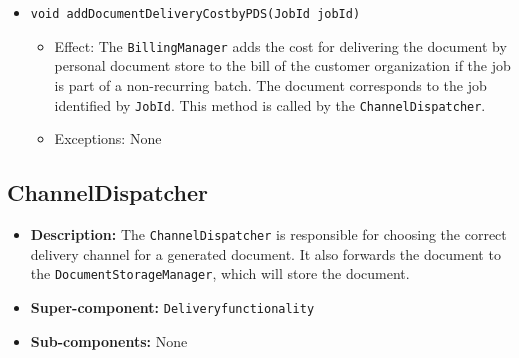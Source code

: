 \documentclass[a4paper,10pt]{article}
\begin{document}
\begin{itemize}
\begin{itemize}
		\item \texttt{void addDocumentDeliveryCostbyPDS(JobId jobId)}       
        \begin{itemize}
            \item Effect: The \texttt{BillingManager} adds the cost for delivering the document by personal document store to the bill of the customer organization if the job is part of a non-recurring batch. The document corresponds to the job identified by \texttt{JobId}. This method is called by the \texttt{ChannelDispatcher}.
            \item Exceptions: None
        \end{itemize}          
        
                     
    \end{itemize}
\end{itemize}

\subsection{ChannelDispatcher}
\begin{itemize}
    \item \textbf{Description:} The \texttt{ChannelDispatcher} is responsible for choosing the correct delivery channel for a generated document. It also forwards the document to the \texttt{DocumentStorageManager}, which will store the document.
    \item \textbf{Super-component:} \texttt{Deliveryfunctionality}
    \item \textbf{Sub-components:} None
\end{itemize}
\end{document}
